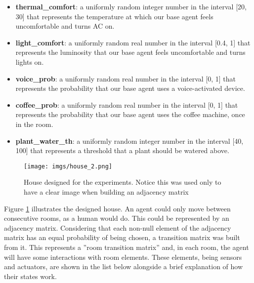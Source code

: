 \begin{itemize}
    \item \textbf{thermal\_comfort}: a uniformly random integer number in the interval [20, 30] that represents the temperature at which our base agent feels uncomfortable and turns AC on.
    \item \textbf{light\_comfort}: a uniformly random real number in the interval [0.4, 1] that represents the luminosity that our base agent feels uncomfortable and turns lights on.
    \item \textbf{voice\_prob}: a uniformly random real number in the interval [0, 1] that represents the probability that our base agent uses a voice-activated device.
    \item \textbf{coffee\_prob}: a uniformly random real number in the interval [0, 1] that represents the probability that our base agent uses the coffee machine, once in the room.
    \item \textbf{plant\_water\_th}: a uniformly random integer number in the interval [40, 100] that represents a threshold that a plant should be watered above.
\end{itemize}



\begin{figure}[bt]
\centering
	\texttt{[image: imgs/house\_2.png]}
\caption{House designed for the experiments. Notice this was used only to have a clear image when building an adjacency matrix}
\label{fig:house}
\end{figure}


Figure \ref{fig:house} illustrates the designed house. An agent could only move between consecutive rooms, as a human would do. This could be represented by an adjacency matrix. 
Considering that each non-null element of the adjacency matrix has an equal probability of being chosen, a transition matrix was built from it. This represents a ''room transition matrix'' and, in each room, the agent will have some interactions with room elements. These elements, being sensors and actuators, are shown in the list below alongside a brief explanation of how their states work.

